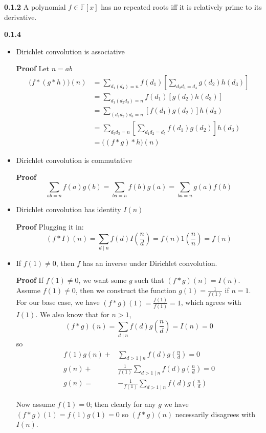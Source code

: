 \documentclass[12pt]{article}
\newcommand{\F}{\mathbb{F}}
\begin{document}
\textbf{0.1.2} A polynomial $f \in \F[x]$ has no repeated roots iff it is relatively prime to its derivative.

\textbf{0.1.4} \begin{itemize}

    \item Dirichlet convolution is associative
    
    \textbf{Proof} Let $n=ab$ $$\begin{aligned}
        \big(f * (g * h) \big)(n)&= \sum_{d_1(d_4) = n} f(d_1) \left[\sum_{d_2d_3 = d_4} g(d_2)h(d_3)\right]\\
        &= \sum_{d_1(d_2d_3) = n} f(d_1)\left[g(d_2)h(d_3)\right]\\
        &= \sum_{(d_1d_2)d_3 = n} \left[f(d_1)g(d_2)\right]h(d_3)\\
        &= \sum_{d_5d_3 = n} \left[\sum_{d_1d_2 = d_5} f(d_1)g(d_2)\right]h(d_3)\\
        &=\big((f*g)*h\big)(n)
    \end{aligned}$$

    \item Dirichlet convolution is commutative
    
    \textbf{Proof} $$\sum_{ab = n} f(a)g(b) = \sum_{ba = n} f(b)g(a) = \sum_{ba = n} g(a)f(b)$$

    \item Dirichlet convolution has identity $I(n)$
    
    \textbf{Proof} Plugging it in: $$(f * I)(n) = \sum_{d \mid n} f(d)I\left(\frac{n}{d}\right) = f(n)1\left(\frac{n}{n}\right) = f(n)$$

    


    \item If $f(1) \neq 0$, then $f$ has an inverse under Dirichlet convolution.
    
    \textbf{Proof} If $f(1) \neq 0$, we want some $g$ such that $(f * g)(n) = I(n)$. Assume $f(1) \neq 0$, then we construct the function $g(1)= \frac{1}{f(1)}$ if $n = 1$. For our base case, we have $(f * g)(1) = \frac{f(1)}{f(1)} = 1$, which agrees with $I(1)$. We also know that for $n > 1$, $$(f * g)(n) = \sum_{d \mid n} f(d)g\left(\frac{n}{d}\right) = I(n) = 0$$ so $$\begin{aligned} f(1)g(n) + & \sum_{d > 1 \mid n} f(d)g\left(\frac{n}{d}\right) = 0\\
        g(n) + & \frac{1}{f(1)} \sum_{d > 1 \mid n} f(d)g\left(\frac{n}{d}\right) = 0\\
    g(n) =& -\frac{1}{f(1)} \sum_{d > 1 \mid n} f(d)g\left(\frac{n}{d}\right)\end{aligned}$$

    Now assume $f(1) = 0$; then clearly for any $g$ we have $(f * g)(1) = f(1)g(1) = 0$ so $(f * g)(n)$ necessarily disagrees with $I(n)$.
\end{itemize}
\end{document}
